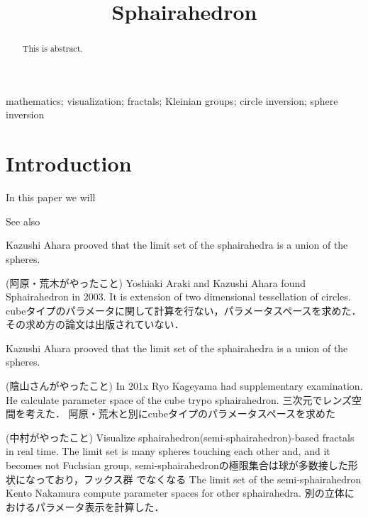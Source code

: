 \documentclass[dvipdfmx]{interact}
\theoremstyle{plain}%
\theoremstyle{definition}
\theoremstyle{remark}
\begin{document}

\title{Sphairahedron}

\author{
}

\maketitle

\begin{abstract}
 This is abstract.
\end{abstract}

\begin{keywords}
mathematics; visualization; fractals; Kleinian groups; circle inversion;
 sphere inversion
\end{keywords}

\section{Introduction}

In this paper we will

See also \cite{bridges2018}

Kazushi Ahara prooved that the limit set of the sphairahedra
is a union of the spheres.

(阿原・荒木がやったこと)
Yoshiaki Araki and Kazushi Ahara found Sphairahedron in 2003.
It is extension of two dimensional tessellation of circles.
cubeタイプのパラメータに関して計算を行ない，パラメータスペースを求めた．
その求め方の論文は出版されていない．

Kazushi Ahara prooved that the limit set of the sphairahedra
is a union of the spheres.

(陰山さんがやったこと)
In 201x Ryo Kageyama had supplementary examination.
He calculate parameter space of the cube trypo sphairahedron.
三次元でレンズ空間を考えた．
阿原・荒木と別にcubeタイプのパラメータスペースを求めた

(中村がやったこと)
Visualize sphairahedron(semi-sphairahedron)-based fractals in real time.
The limit set is many spheres touching each other and,
and it becomes not Fuchsian group,
semi-sphairahedronの極限集合は球が多数接した形状になっており，フックス群
でなくなる
The limit set of the semi-sphairahedron
Kento Nakamura compute parameter spaces for other sphairahedra.
別の立体におけるパラメータ表示を計算した．
\end{document}
